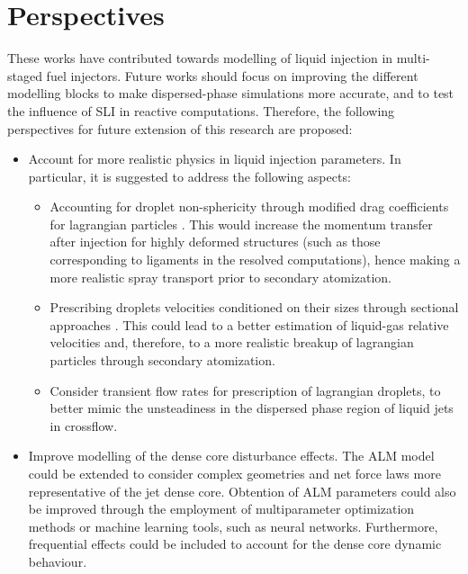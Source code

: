 \clearpage




\section*{Perspectives}

These works have contributed towards modelling of liquid injection in multi-staged fuel injectors. Future works should focus on improving the different modelling blocks to make dispersed-phase simulations more accurate, and to test the influence of SLI in reactive computations. Therefore, the following perspectives for future extension of this research are proposed:


\begin{itemize}

	\item Account for more realistic physics in liquid injection parameters.  In particular, it is suggested to address the following aspects:
	
	\begin{itemize}
	
		\item Accounting for droplet non-sphericity through modified drag coefficients for lagrangian particles . This would increase the momentum transfer after injection for highly deformed structures (such as those corresponding to ligaments in the resolved computations), hence making a more realistic spray transport prior to secondary atomization. 
		
		\item Prescribing droplets velocities conditioned on their sizes through sectional approaches . This could lead to a better estimation of liquid-gas relative velocities and, therefore, to a more realistic breakup of lagrangian particles through secondary atomization.
		
		\item Consider transient flow rates for prescription of lagrangian droplets, to better mimic the unsteadiness in the dispersed phase region of liquid jets in crossflow.
	
	\end{itemize}
	
	\item Improve modelling of the dense core disturbance effects. The ALM model could be extended to consider complex geometries and net force laws more representative of the jet dense core. Obtention of ALM parameters could also be improved through the employment of multiparameter optimization methods or machine learning tools, such as neural networks. Furthermore, frequential effects could be included to account for the dense core dynamic behaviour.
	

\end{itemize}
